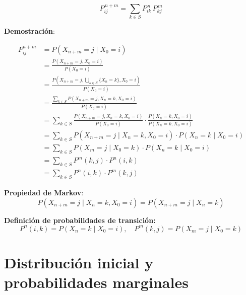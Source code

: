 \documentclass[12pt,a4paper]{article}
\begin{document}
\begin{equation*}
P_{ij}^{\,n+m} = \sum_{k \in S} P_{ik}^{\,n} \, P_{kj}^{\,m}
\end{equation*}

\textbf{Demostración}:

\begin{align*}
P_{ij}^{n+m} &= P(X_{n+m}=j \mid X_0=i) \\
&= \frac{P(X_{n+m}=j, X_0=i)}{P(X_0=i)} \\
&= \frac{P(X_{n+m}=j, \bigcup_{k \in S} \{X_n=k\}, X_0=i)}{P(X_0=i)} \\
&= \frac{\sum_{k \in S} P(X_{n+m}=j, X_n=k, X_0=i)}{P(X_0=i)} \\
&= \sum_{k \in S} \frac{P(X_{n+m}=j, X_n=k, X_0=i)}{P(X_0=i)} \cdot \frac{P(X_n=k, X_0=i)}{P(X_n=k, X_0=i)} \\
&= \sum_{k \in S} P(X_{n+m}=j \mid X_n=k, X_0=i) \cdot P(X_n=k \mid X_0=i) \\
&= \sum_{k \in S} P(X_{m}=j \mid X_0=k) \cdot P(X_n=k \mid X_0=i) \\
&= \sum_{k \in S} P^m(k,j) \cdot P^n(i,k) \\
&= \sum_{k \in S} P^n(i,k) \cdot P^m(k,j)
\end{align*}

\textbf{Propiedad de Markov}:
\begin{equation*}
P(X_{n+m}=j \mid X_n=k, X_0=i) = P(X_{n+m}=j \mid X_n=k)
\end{equation*}

\textbf{Definición de probabilidades de transición:}
\begin{equation*}
P^n(i,k) = P(X_n=k \mid X_0=i), \quad P^m(k,j) = P(X_m=j \mid X_0=k)
\end{equation*}

\section*{Distribución inicial y probabilidades marginales}

\begin{center}
\end{center}
\end{document}
